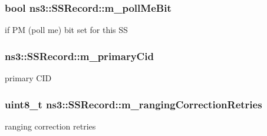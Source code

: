 \subsubsection[{\texorpdfstring{m\+\_\+poll\+Me\+Bit}{m_pollMeBit}}]{\setlength{\rightskip}{0pt plus 5cm}bool ns3\+::\+S\+S\+Record\+::m\+\_\+poll\+Me\+Bit\hspace{0.3cm}{\ttfamily [private]}}\hypertarget{classns3_1_1SSRecord_a96aeaab56a5c343a383e9e846c8790b2}{}\label{classns3_1_1SSRecord_a96aeaab56a5c343a383e9e846c8790b2}


if PM (poll me) bit set for this SS 

\subsubsection[{\texorpdfstring{m\+\_\+primary\+Cid}{m_primaryCid}}]{ ns3\+::\+S\+S\+Record\+::m\+\_\+primary\+Cid\hspace{0.3cm}{\ttfamily [private]}}\hypertarget{classns3_1_1SSRecord_aadd3be13d83cd0748c1e960e6384470c}{}\label{classns3_1_1SSRecord_aadd3be13d83cd0748c1e960e6384470c}


primary C\+ID 

\subsubsection[{\texorpdfstring{m\+\_\+ranging\+Correction\+Retries}{m_rangingCorrectionRetries}}]{\setlength{\rightskip}{0pt plus 5cm}uint8\+\_\+t ns3\+::\+S\+S\+Record\+::m\+\_\+ranging\+Correction\+Retries\hspace{0.3cm}{\ttfamily [private]}}\hypertarget{classns3_1_1SSRecord_ae3dbee9e71d6b5dcd01f0797bc4705dd}{}\label{classns3_1_1SSRecord_ae3dbee9e71d6b5dcd01f0797bc4705dd}


ranging correction retries 

